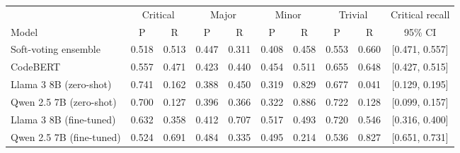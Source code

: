 \begin{tabular*}{\tblwidth}{@{\extracolsep{\fill}} l cc cc cc cc c @{}}
\toprule
 & \multicolumn{2}{c}{Critical} & \multicolumn{2}{c}{Major} & \multicolumn{2}{c}{Minor} & \multicolumn{2}{c}{Trivial} & Critical recall \\
\cmidrule(lr){2-3}\cmidrule(lr){4-5}\cmidrule(lr){6-7}\cmidrule(lr){8-9}
Model & P & R & P & R & P & R & P & R & 95\% CI \\
\midrule
Soft-voting ensemble & 0.518 & 0.513 & 0.447 & 0.311 & 0.408 & 0.458 & 0.553 & 0.660 & [0.471, 0.557] \\
CodeBERT & 0.557 & 0.471 & 0.423 & 0.440 & 0.454 & 0.511 & 0.655 & 0.648 & [0.427, 0.515] \\
Llama 3 8B (zero-shot) & 0.741 & 0.162 & 0.388 & 0.450 & 0.319 & 0.829 & 0.677 & 0.041 & [0.129, 0.195] \\
Qwen 2.5 7B (zero-shot) & 0.700 & 0.127 & 0.396 & 0.366 & 0.322 & 0.886 & 0.722 & 0.128 & [0.099, 0.157] \\
Llama 3 8B (fine-tuned) & 0.632 & 0.358 & 0.412 & 0.707 & 0.517 & 0.493 & 0.720 & 0.546 & [0.316, 0.400] \\
Qwen 2.5 7B (fine-tuned) & 0.524 & 0.691 & 0.484 & 0.335 & 0.495 & 0.214 & 0.536 & 0.827 & [0.651, 0.731] \\
\bottomrule
\end{tabular*}

